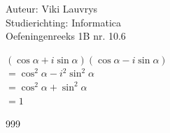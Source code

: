 \documentclass[a4paper]{article}
\begin{document}
  
\noindent \large Auteur: Viki Lauvrys        \\
\noindent \large Studierichting: Informatica \\
\noindent \large Oefeningenreeks 1B nr. 10.6 \\

\medskip

\normalsize

$ (\cos \alpha + i \sin \alpha) (\cos \alpha - i \sin \alpha) $ \\

$ = \cos^2 \alpha - i^2 \sin^2 \alpha $ \\

$ = \cos^2 \alpha + \sin^2 \alpha $ \\

$ = 1 $ \\

\begin{thebibliography}{999}
\end{thebibliography}
\end{document}
